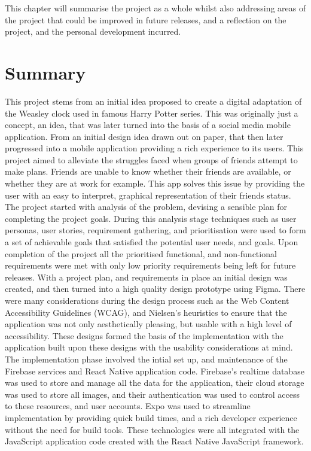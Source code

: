 This chapter will summarise the project as a whole whilst also addressing areas of the project that could be improved in future releases, and a reflection on the project, and the personal development incurred.

\section{Summary}
This project stems from an initial idea proposed to create a digital adaptation of the Weasley clock used in famous Harry Potter series. This was originally just a concept, an idea, that was later turned into the basis of a social media mobile application. From an initial design idea drawn out on paper, that then later progressed into a mobile application providing a rich experience to its users. This project aimed to alleviate the struggles faced when groups of friends attempt to make plans. Friends are unable to know whether their friends are available, or whether they are at work for example. This app solves this issue by providing the user with an easy to interpret, graphical representation of their friends status.\newline\newline
The project started with analysis of the problem, devising a sensible plan for completing the project goals. During this analysis stage techniques such as user personas, user stories, requirement gathering, and prioritisation were used to form a set of achievable goals that satisfied the potential user needs, and goals. Upon completion of the project all the prioritised functional, and non-functional requirements were met with only low priority requirements being left for future releases. \newline\newline  
With a project plan, and requirements in place an initial design was created, and then turned into a high quality design prototype using Figma. There were many considerations during the design process such as the Web Content Accessibility Guidelines (WCAG), and Nielsen's heuristics to ensure that the application was not only aesthetically pleasing, but usable with a high level of accessibility.\newline\newline
These designs formed the basis of the implementation with the application built upon these designs with the usability considerations at mind. The implementation phase involved the intial set up, and maintenance of the Firebase services and React Native application code. Firebase's realtime database was used to store and manage all the data for the application, their cloud storage was used to store all images, and their authentication was used to control access to these resources, and user accounts. Expo was used to streamline implementation by providing quick build times, and a rich developer experience without the need for build tools. These technologies were all integrated with the JavaScript application code created with the React Native JavaScript framework. \newline\newline
